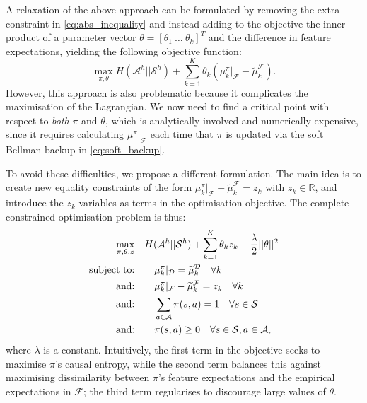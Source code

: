 \documentclass[a4paper,11pt]{report}
\begin{document}
A relaxation of the above approach can be formulated by removing the extra constraint in \eqref{eq:abs_inequality} and instead adding to the objective the inner product of a parameter vector $\theta=\left[\theta_1~\ldots~\theta_k\right]^T$ and the difference in feature expectations, yielding the following objective function:
	\begin{equation}
		\max\limits_{\pi,\theta} H(\mathcal{A}^h||\mathcal{S}^h) + \sum^K_{k=1} \theta_k (\mu^{\pi}_k|_{\mathcal{F}} - \widetilde{\mu}^{\mathcal{F}}_k).
	\end{equation}
However, this approach is also problematic because it complicates the maximisation of the Lagrangian. We now need to find a critical point with respect to \emph{both} $\pi$ and $\theta$, which is analytically involved and numerically expensive, since it requires calculating $\mu^{\pi}|_{\mathcal{F}}$ each time that $\pi$ is updated via the soft Bellman backup in \eqref{eq:soft_backup}.

To avoid these difficulties, we propose a different formulation.  The main idea is to create new equality constraints of the form $\mu_k^{\pi}|_{\mathcal{F}} -\widetilde{\mu}_k^{\mathcal{F}}=z_k$ with $z_k\in\mathbb R$, and introduce the $z_k$ variables as terms in the optimisation objective.  The complete constrained optimisation problem is thus:
\begin{align}
 \quad\max\limits_{\pi,\theta,z}&\quad H(\mathcal{A}^h||\mathcal{S}^h) + \sum_{k=1}^K \theta_k z_k - \frac{\lambda}{2}||\mathbf{\theta}||^2 \label{eq:primal_obj_failure}\\
\hbox{subject to:}&\quad \quad\mu^{\pi}_k|_{\mathcal{D}}=\widetilde{\mu}^{\mathcal{D}}_k\quad\forall k \label{eq:features_equality_constraint_failure}\\
\hbox{and:}&\quad \quad  \mu_k^{\pi}|_{\mathcal{F}} -\widetilde{\mu}_k^{\mathcal{F}}=z_k \quad \forall k\\
\hbox{and:}&\quad \quad\sum_{a\in\mathcal{A}}\pi(s,a)  = 1\quad\forall s\in\mathcal{S}\\
\hbox{and:}&\quad \quad\pi(s,a) \geq 0\quad\forall s\in\mathcal{S},a\in\mathcal{A},  
\end{align}
where $\lambda$ is a constant.  
Intuitively, the first term in the objective seeks to maximise $\pi$'s causal entropy, while the second term balances this against maximising dissimilarity between $\pi$'s feature expectations and the empirical expectations in $\mathcal{F}$; the third term regularises to discourage large values of $\theta$.
\end{document}

